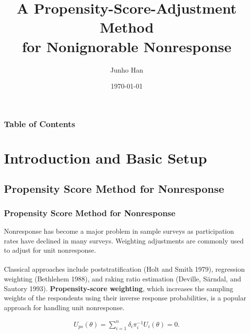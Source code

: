 \documentclass{beamer}
\title[MAS583 Final Presentation]{A Propensity-Score-Adjustment Method\\ for Nonignorable Nonresponse} %
\author{Junho Han} %
\institute[MathSci, KAIST] %
{
MathSci, KAIST \\ %
}
\date{\today} %
\newcommand{\bra}[1]{\left(#1\right)}
\newcommand{\al}[1]{\begin{align*}#1\end{align*}}
\begin{document}
\begin{frame}
\titlepage %
\end{frame}

\begin{frame}
\frametitle{Table of Contents} %
\tableofcontents %
\end{frame}


\section{Introduction and Basic Setup} %

\subsection{Propensity Score Method for Nonresponse}
\begin{frame}
\frametitle{Propensity Score Method for Nonresponse}
Nonresponse has become a major problem in sample surveys as participation rates have declined in many surveys. Weighting adjustments are commonly used to adjust for unit nonresponse. \\~\\

Classical approaches include poststratification (Holt and Smith 1979), regression weighting (Bethlehem 1988), and raking ratio estimation (Deville, Särndal, and Sautory 1993). \textbf{Propensity-score weighting}, which increases the sampling weights of the respondents using their inverse response probabilities, is a popular approach for handling unit nonresponse.

\al{U_{ps}\bra{\theta}=\sum_{i=1}^{n} \delta_{i} {\pi_{i}^{-1}U_i\bra{\theta}} = 0.}
\end{frame}
\end{document}
